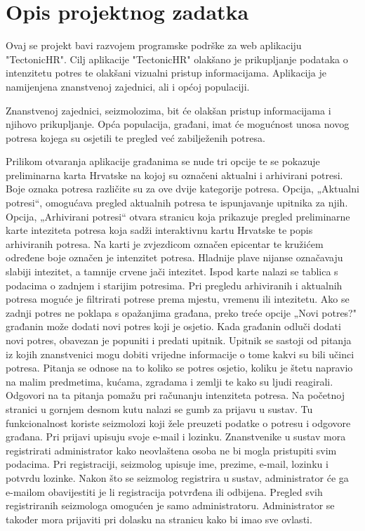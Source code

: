 \chapter{Opis projektnog zadatka}
		


{Ovaj se projekt bavi razvojem programske podrške za web aplikaciju "TectonicHR". 
	Cilj aplikacije "TectonicHR" olakšano je prikupljanje podataka o intenzitetu potres te olakšani vizualni pristup informacijama. 
	Aplikacija je namijenjena znanstvenoj zajednici, ali i općoj populaciji.
	
	 
	Znanstvenoj zajednici, seizmolozima, bit će olakšan pristup informacijama i njihovo prikupljanje.  
	Opća populacija, građani, imat će mogućnost unosa novog potresa kojega su osjetili te pregled već zabilježenih potresa.  
	
	
	Prilikom otvaranja aplikacije građanima se nude tri opcije te se pokazuje preliminarna karta Hrvatske na kojoj su označeni aktualni i arhivirani potresi. Boje oznaka potresa različite su za ove dvije kategorije potresa.
	Opcija, „Aktualni potresi“, omogućava pregled aktualnih potresa te ispunjavanje upitnika za njih. 
	Opcija, „Arhivirani potresi“ otvara stranicu koja prikazuje pregled preliminarne karte inteziteta potresa koja sadži interaktivnu kartu Hrvatske te popis arhiviranih potresa. 
	Na karti je zvjezdicom označen epicentar te kružićem određene boje označen je intenzitet potresa. Hladnije plave nijanse označavaju slabiji intezitet, a tamnije crvene jači intezitet. 
	Ispod karte nalazi se tablica s podacima o zadnjem i starijim potresima. Pri pregledu arhiviranih i aktualnih potresa moguće je filtrirati potrese prema mjestu, vremenu ili intezitetu. 
	Ako se zadnji potres ne poklapa s opažanjima građana, preko treće opcije „Novi potres?" građanin može dodati novi potres koji je osjetio. 
	Kada građanin odluči dodati novi potres, obavezan je popuniti i predati upitnik. 
	Upitnik se sastoji od pitanja iz kojih znanstvenici mogu dobiti vrijedne informacije o tome kakvi su bili učinci potresa. 
	Pitanja se odnose na to koliko se potres osjetio, koliku je štetu napravio na malim predmetima, kućama, zgradama i zemlji te kako su ljudi reagirali. 
	Odgovori na ta pitanja pomažu pri računanju intenziteta potresa. 
	Na početnoj stranici u gornjem desnom kutu nalazi se gumb za prijavu u sustav. Tu funkcionalnost koriste seizmolozi koji žele preuzeti podatke o potresu i odgovore građana.  Pri prijavi upisuju svoje e-mail i lozinku. 
	Znanstvenike u sustav mora registrirati administrator kako neovlaštena osoba ne bi mogla pristupiti svim podacima. Pri registraciji, seizmolog upisuje ime, prezime, e-mail, lozinku i potvrdu lozinke. Nakon što se seizmolog registrira u sustav, administrator će ga e-mailom obavijestiti je li registracija potvrđena ili odbijena. 
	Pregled svih registriranih seizmologa omogućen je samo administratoru.
	Administrator se također mora prijaviti pri dolasku na stranicu kako bi imao sve ovlasti. \\
	
	}
	
